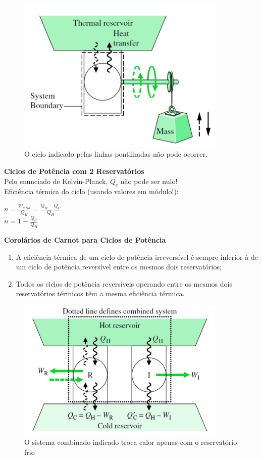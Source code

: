 \documentclass[a4paper, 12pt]{article}
\begin{document}
	\begin{figure}[h]
		\includegraphics[width = 10cm]{re.png}
		\centering
		\caption{O ciclo indicado pelas linhas pontilhadas
			não pode ocorrer.}
	\end{figure}

\textbf{Ciclos de Potência com 2 Reservatórios}\\

Pelo enunciado de Kelvin-Planck, $ Q_c $ não pode ser nulo!\\

Eficiência térmica do ciclo
(usando valores em módulo!):
	\begin{center}
		\large
		$ n = \frac{W_{ciclo}}{Q_H} = \frac{Q_H - Q_C}{Q_H} $\\
		$ n = 1 - \frac{Q_C}{Q_H} $
	\end{center}

\textbf{Corolários de Carnot para Ciclos de Potência}
	\begin{enumerate}
		\item A eficiência térmica de um ciclo de potência irreversível é sempre inferior
		à de um ciclo de potência reversível entre os mesmos dois reservatórios;
		\item Todos os ciclos de potência reversíveis operando entre os mesmos dois
		reservatórios térmicos têm a mesma eficiência térmica.
	\end{enumerate}
	
	\begin{figure}[h]
		\includegraphics[width = 10cm]{rr.png}
		\centering
		\caption{O sistema combinado indicado troca
			calor apenas com o reservatório frio}
	\end{figure}
	
\end{document}
